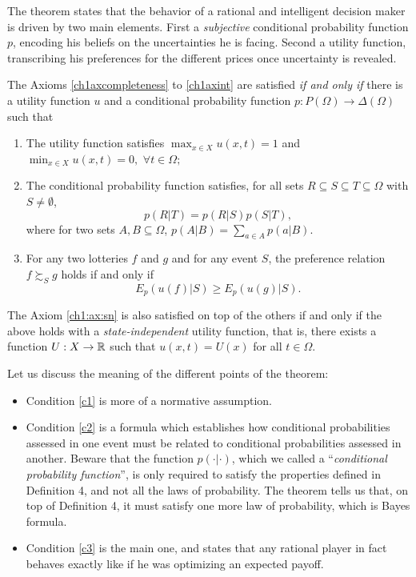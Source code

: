 The theorem states that the behavior of a rational and intelligent decision maker is driven by two main elements. First a \emph{subjective} conditional probability function $p$, encoding his beliefs on the uncertainties he is facing. Second a utility function, transcribing his preferences for the different prices once uncertainty is revealed.


\begin{theorem}
The Axioms \ref{ch1axcompleteness} to \ref{ch1axint}  are satisfied \emph{if and only if} there is a utility function $u$ and a conditional probability function $p : P(\Omega) \rightarrow  \Delta(\Omega)$ such that
\begin{enumerate}
\item The utility function satisfies $\max_{x \in X} u(x,t) = 1$ and $\min_{x \in X} u(x,t) =0,$  $\forall t \in \Omega;$
\label{c1}
\item The conditional probability function satisfies, for all sets $R \subseteq S \subseteq T \subseteq \Omega$ with $S \neq \emptyset$,
\begin{equation}
p(R|T) = p(R|S)p(S|T),
\label{ch1:eq:probaas}
\end{equation}
where for two sets $A, B \subseteq \Omega$, $p(A|B) = \sum_{a \in A}p(a|B).$
\label{c2}
\item For any two lotteries $f$ and $g$ and for any event $S$, the preference relation $f \succsim_S g$ holds if and only if
$$ E_p(u(f) | S) \geq E_p(u(g) | S).$$
\label{c3}
\end{enumerate}
The Axiom \ref{ch1:ax:sn} is also satisfied on top of the others if and only if the above holds with a \emph{state-independent} utility function, that is,
there exists a function $U : X \rightarrow \mathbb{R}$ such that
$u(x,t) = U(x)$ for all $t \in \Omega$.
\label{ch1:utility-maximization}
\end{theorem}


Let us discuss the meaning of the different points of the theorem:
\begin{itemize}
\item Condition \ref{c1} is more of a normative assumption.
\item Condition \ref{c2} is a formula which establishes how conditional probabilities assessed in one event must be related to conditional probabilities assessed in another. Beware that the function $p(\cdot|\cdot)$, which we called a ``\emph{conditional probability function}'', is  only required to satisfy the properties defined in Definition 4, and not all the laws of probability.  The theorem tells us that, on top of Definition 4, it must satisfy one more law of probability, which is Bayes formula.
\item Condition \ref{c3} is the main one, and states that any rational player in fact behaves exactly like if he was optimizing an expected payoff.
\end{itemize}

